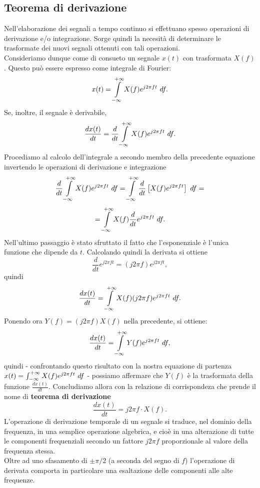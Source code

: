 \documentclass[12pt,oneside,openany]{memoir}
\numberwithin{equation}{subsection}
\newcommand{\df}{\ df}
\begin{document}
\newpage
\subsection{Teorema di derivazione}
Nell'elaborazione dei segnali a tempo continuo si effettuano spesso operazioni
di derivazione e/o integrazione. Sorge quindi la necesit\`a di determinare le
trasformate dei nuovi segnali ottenuti con tali operazioni.\\
Consideriamo dunque come di consueto un segnale $x(t)$ con trasformata $X(f)$.
Questo pu\`o essere espresso come integrale di Fourier:
\[
    x(t) = \int\displaylimits_{-\infty}^{+\infty} X(f) e^{j 2 \pi f t} \df.
\]
Se, inoltre, il segnale \`e derivabile,
\[
    \frac{d x(t)}{dt} = \frac{d}{dt} \int\displaylimits_{-\infty}^{+\infty}
    X(f) e^{j 2 \pi f t} \df.
\]
Procediamo al calcolo dell'integrale a secondo membro della precedente equazione
invertendo le operazioni di derivazione e integrazione
\[
    \frac{d}{dt} \int\displaylimits_{-\infty}^{+\infty} X(f) e^{j 2 \pi f t} \df
    = \int\displaylimits_{-\infty}^{+\infty} \frac{d}{dt} \left[X(f) 
    e^{j 2 \pi f t}\right] \df =
\]
\[
    = \int\displaylimits_{-\infty}^{+\infty} X(f) \frac{d}{dt} e^{j 2 \pi f t}
    \df.
\]
Nell'ultimo passaggio \`e stato sfruttato il fatto che l'esponenziale \`e
l'unica funzione che dipende da $t$. Calcolando quindi la derivata si ottiene
\[
    \frac{d}{dt} e^{j 2 \pi f t} = (j 2 \pi f) e^{j 2 \pi f t},
\]
quindi
\[
    \frac{d x(t)}{dt} = \int\displaylimits_{-\infty}^{+\infty} X(f) (j 2 \pi f)
    e^{j 2 \pi f t} \df.
\]
Ponendo ora $Y(f) = (j 2 \pi f) X(f)$ nella precedente, si ottiene:
\[
    \frac{d x(t)}{dt} = \int\displaylimits_{-\infty}^{+\infty} Y(f)
    e^{j 2 \pi f t} \df,
\]
quindi - confrontando questo risultato con la nostra equazione di partenza
$x(t) = \int\displaylimits_{-\infty}^{+\infty} X(f) e^{j 2 \pi f t} \df$ -
possiamo affermare che $Y(f)$ \`e la trasformata della funzione
$\frac{d x(t)}{dt}$. Concludiamo allora con la relazione di corrispondeza che
prende il nome di \textbf{teorema di derivazione}
\[
    \frac{d x(t)}{dt} = j 2 \pi f \cdot X(f).
\]
L'operazione di derivazione temporale di un segnale si traduce, nel dominio
della frequenza, in una semplice operazione algebrica, e cio\`e in una
alterazione di tutte le componenti frequenziali secondo un fattore $j 2 \pi f$
proporzionale al valore della frequenza stessa.\\
Oltre ad uno sfasamento di $\pm \pi/2$ (a seconda del segno di $f$)
l'operazione di derivata comporta in particolare una esaltazione delle
componenti alle alte frequenze.
\end{document}
